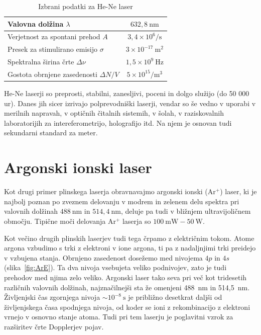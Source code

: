 \begin{table}
\begin{center}
\begin{tabular}{|l|c|}\hline
Valovna dolžina $\lambda$ & $632,8~\si{\nano\metre}$ \\ \hline
Verjetnost za spontani prehod $A$ & $3,4 \times 10^6/\si{\second}$  \\ \hline
Presek za stimulirano emisijo $\sigma$ & $3 \times 10^{-17}~\si{\metre}^2$  \\ \hline
Spektralna širina črte $\Delta \nu$ & $1,5 \times 10^{9}~\si{\hertz}$  \\ \hline
Gostota obrnjene zasedenosti $\Delta N/V$ & $5 \times 10^{15}/\si{\metre}^3$ \\ \hline
\end{tabular}
\caption{Izbrani podatki za He-Ne laser}
\label{tab:HeNe}
\end{center}
\end{table}

He-Ne laserji so preprosti, stabilni, zanesljivi, poceni in dolgo služijo (do 50 000 ur).
Danes jih sicer izrivajo polprevodniški laserji, vendar so še vedno v uporabi
v merilnih napravah, v optičnih čitalnih sistemih, v šolah, v raziskovalnih 
laboratorijih za intereferometrijo, holografijo itd. Na njem je osnovan tudi 
sekundarni standard za meter.

\section{Argonski ionski laser}

Kot drugi primer plinskega laserja obravnavajmo argonski ionski (Ar$^+$) laser,
ki je najbolj poznan po zveznem delovanju v modrem in zelenem delu spektra pri 
valovnih dolžinah $488~\si{\nano\metre}$ in $514,4~\si{\nano\metre}$, deluje 
pa tudi v bližnjem ultravijoličnem območju. Tipične moči delovanja Ar$^+$ laserja
so $100~\si{\milli\watt} - 50~\si{\watt}$.

Kot večino drugih plinskih laserjev tudi tega črpamo z električnim tokom.
Atome argona vzbudimo s trki z elektroni v ione argona, ti pa z nadaljnjimi
trki preidejo v vzbujena stanja. Obrnjeno zasedenost
dosežemo med nivojema $4p$ in $4s$ (slika~\ref{fig:ArE}). 
Ta dva nivoja vsebujeta veliko podnivojev, zato je tudi prehodov med
njima zelo veliko. Argonski laser tako seva pri več kot tridesetih različnih
valovnih dolžinah, najznačilnejši sta že omenjeni 488~nm in 514,5~nm. 
Življenjski čas zgornjega nivoja $\sim 10^{-8}~\si{\second}$ je približno 
desetkrat daljši od življenjskega časa spodnjega nivoja, od koder se ioni
z rekombinacijo z elektroni vrnejo v osnovno stanje atoma. Tudi pri tem laserju
je poglavitni vzrok za razširitev črte Dopplerjev pojav. 

